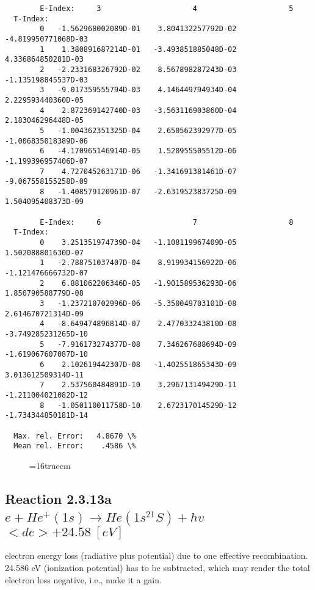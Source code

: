 \documentclass[12pt,dvipdfmx]{article}
\begin{document}
{\begin{small}
\begin{verbatim}
        E-Index:     3                     4                     5
  T-Index:
        0   -1.562968002089D-01    3.804132257792D-02   -4.819950771068D-03
        1    1.380891687214D-01   -3.493851885048D-02    4.336864850281D-03
        2   -2.233168326792D-02    8.567898287243D-03   -1.135198845537D-03
        3   -9.017359555794D-03    4.146449794934D-04    2.229593440360D-05
        4    2.872369142740D-03   -3.563116903860D-04    2.183046296448D-05
        5   -1.004362351325D-04    2.650562392977D-05   -1.006835018389D-06
        6   -4.170965146914D-05    1.520955505512D-06   -1.199396957406D-07
        7    4.727045263171D-06   -1.341691381461D-07   -9.067558155258D-09
        8   -1.408579120961D-07   -2.631952383725D-09    1.504095408373D-09

        E-Index:     6                     7                     8
  T-Index:
        0    3.251351974739D-04   -1.108119967409D-05    1.502088801630D-07
        1   -2.788751037407D-04    8.919934156922D-06   -1.121476666732D-07
        2    6.881062206346D-05   -1.901589536293D-06    1.850790588779D-08
        3   -1.237210702996D-06   -5.350049703101D-08    2.614670721314D-09
        4   -8.649474896814D-07    2.477033243810D-08   -3.749285231265D-10
        5   -7.916173274377D-08    7.346267688694D-09   -1.619067607087D-10
        6    2.102619442307D-08   -1.402551865343D-09    3.013612509314D-11
        7    2.537560484891D-10    3.296713149429D-11   -1.211004021082D-12
        8   -1.050110011758D-10    2.672317014529D-12   -1.734344850181D-14

  Max. rel. Error:   4.8670 \%
  Mean rel. Error:    .4586 \%

\end{verbatim}\end{small}
\begin{figure} \label{2.3.9aec}
\epsfxsize=16truecm
\end{figure}
\newpage



\subsection{
Reaction 2.3.13a $e + He^+(1s) \rightarrow   He(1s^21S)+ hv $ \ $<de>+24.58 \ [eV]$ }


  electron energy loss (radiative plus potential) due to one effective
  recombination. 24.586 eV (ionization potential) has to be
  subtracted, which may render the total electron loss negative, i.e., make it a gain.

}
\end{document}
